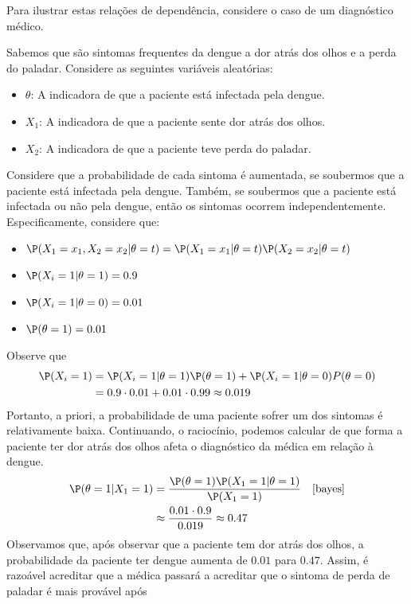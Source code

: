 Para ilustrar estas relações de dependência,
considere o caso de um diagnóstico médico.
\begin{example}
 Sabemos que são sintomas frequentes da dengue
 a dor atrás dos olhos e a perda do paladar.
 Considere as seguintes variáveis aleatórias:
 \begin{itemize}
  \item $\theta$: A indicadora de que 
  a paciente está infectada pela dengue.
  \item $X_{1}$: A indicadora de que
  a paciente sente dor atrás dos olhos.
  \item $X_{2}$: A indicadora de que
  a paciente teve perda do paladar.
 \end{itemize}
 Considere que a probabilidade de 
 cada sintoma é aumentada, se soubermos que 
 a paciente está infectada pela dengue.
 Também, se soubermos que a paciente está 
 infectada ou não pela dengue, então 
 os sintomas ocorrem independentemente.
 Especificamente, considere que:
 \begin{itemize}
  \item $\P(X_{1}=x_{1},X_{2}=x_{2}|\theta=t)
  =\P(X_{1}=x_{1}|\theta=t)\P(X_{2}=x_{2}|\theta=t)$
  \item $\P(X_{i}=1|\theta=1) = 0.9$
  \item $\P(X_{i}=1|\theta=0) = 0.01$
  \item $\P(\theta=1) = 0.01$
 \end{itemize}
 Observe que
 \begin{align*}
  \P(X_{i}=1)
  &=\P(X_{i}=1|\theta=1)\P(\theta=1)
  +\P(X_{i}=1|\theta=0)P(\theta=0) \\
  &= 0.9 \cdot 0.01 + 0.01 \cdot 0.99 \approx 0.019
 \end{align*}
 Portanto, a priori, a probabilidade de uma
 paciente sofrer um dos sintomas é relativamente baixa.
 Continuando, o raciocínio, podemos calcular de que 
 forma a paciente ter dor atrás dos olhos afeta
 o diagnóstico da médica em relação à dengue.
 \begin{align*}
  \P(\theta=1|X_{1}=1)
  &= \frac{\P(\theta=1)\P(X_{1}=1|\theta=1)}
  {\P(X_{1}=1)}
  & \text{\cref{bayes}} \\
  &\approx \frac{0.01 \cdot 0.9}{0.019} 
  \approx 0.47
 \end{align*}
 Observamos que, após observar que 
 a paciente tem dor atrás dos olhos,
 a probabilidade da paciente ter dengue aumenta 
 de $0.01$ para $0.47$.
 Assim, é razoável acreditar que 
 a médica passará a acreditar que o sintoma
 de perda de paladar é mais provável após 

\end{example}
